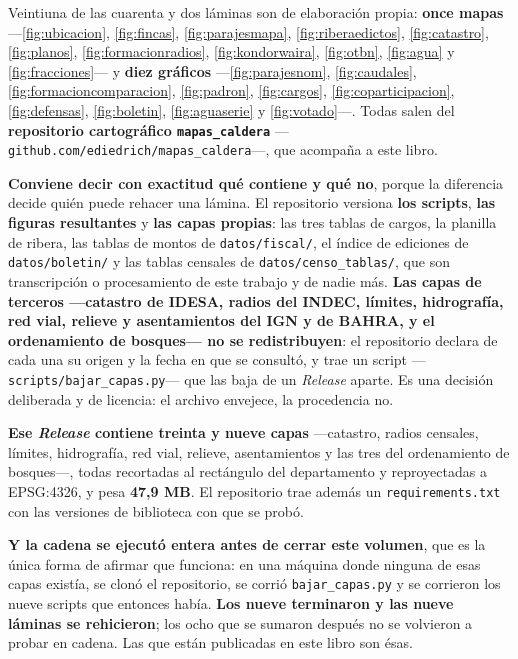 Veintiuna de las cuarenta y dos láminas son de elaboración propia: \textbf{once mapas}
---\ref{fig:ubicacion}, \ref{fig:fincas}, \ref{fig:parajesmapa}, \ref{fig:riberaedictos},
\ref{fig:catastro}, \ref{fig:planos}, \ref{fig:formacionradios}, \ref{fig:kondorwaira},
\ref{fig:otbn}, \ref{fig:agua} y \ref{fig:fracciones}--- y \textbf{diez gráficos} ---\ref{fig:parajesnom}, \ref{fig:caudales},
\ref{fig:formacioncomparacion}, \ref{fig:padron}, \ref{fig:cargos}, \ref{fig:coparticipacion}, \ref{fig:defensas}, \ref{fig:boletin}, \ref{fig:aguaserie} y \ref{fig:votado}---. Todas salen del \textbf{repositorio cartográfico \texttt{mapas\_caldera}}
---\texttt{github.com/ediedrich/mapas\_caldera}---, que acompaña a este libro.

\textbf{Conviene decir con exactitud qué contiene y qué no}, porque la diferencia decide
quién puede rehacer una lámina. El repositorio versiona \textbf{los scripts}, \textbf{las
figuras resultantes} y \textbf{las capas propias}: las tres tablas de cargos, la planilla de
ribera, las tablas de montos de \texttt{datos/fiscal/}, el índice de ediciones de
\texttt{datos/boletin/} y las tablas censales de \texttt{datos/censo\_tablas/}, que son
transcripción o procesamiento de este trabajo y de nadie más. \textbf{Las capas de terceros
---catastro de IDESA, radios del INDEC, límites, hidrografía, red vial, relieve y
asentamientos del IGN y de BAHRA, y el ordenamiento de bosques--- no se redistribuyen}: el
repositorio declara de cada una su origen y la fecha en que se consultó, y trae un script
---\texttt{scripts/bajar\_capas.py}--- que las baja de un \textit{Release} aparte. Es una
decisión deliberada y de licencia: el archivo envejece, la procedencia no.

\textbf{Ese \textit{Release} contiene treinta y nueve capas} ---catastro, radios censales,
límites, hidrografía, red vial, relieve, asentamientos y las tres del ordenamiento de
bosques---, todas recortadas al rectángulo del departamento y reproyectadas a EPSG:4326, y
pesa \textbf{47,9 MB}. El repositorio trae además un \texttt{requirements.txt} con las
versiones de biblioteca con que se probó.

\textbf{Y la cadena se ejecutó entera antes de cerrar este volumen}, que es la única forma de
afirmar que funciona: en una máquina donde ninguna de esas capas existía, se clonó el
repositorio, se corrió \texttt{bajar\_capas.py} y se corrieron los nueve scripts que entonces había. \textbf{Los
nueve terminaron y las nueve láminas se rehicieron}; los ocho que se sumaron después no se volvieron a probar en cadena. Las que están publicadas en este libro
son ésas.

